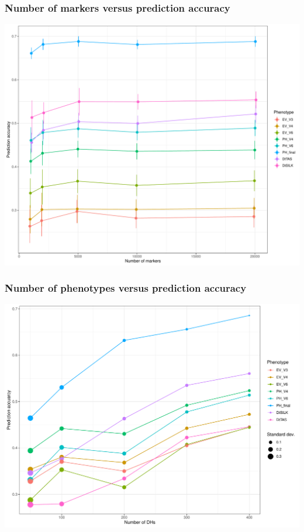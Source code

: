 \documentclass{beamer}
\begin{document}
\begin{frame}
  \frametitle{Number of markers versus prediction accuracy}
  \includegraphics[height=.8\textheight,width=.9\textwidth]{marker_vs_acc}
\end{frame}

\begin{frame}
\frametitle{Number of phenotypes versus prediction accuracy}
  \includegraphics[height=.8\textheight,width=.9\textwidth]{phenos_acc}
\end{frame}
\end{document}
